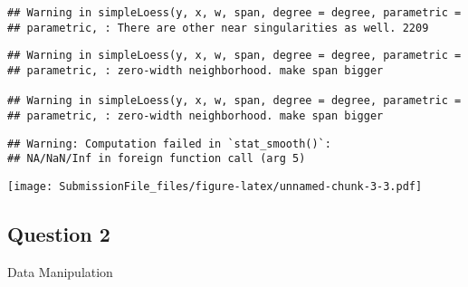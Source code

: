 \documentclass[]{article}
\newenvironment{Shaded}{\begin{snugshade}}{\end{snugshade}}
\newcommand{\DataTypeTok}[1]{\textcolor[rgb]{0.13,0.29,0.53}{#1}}
\newcommand{\KeywordTok}[1]{\textcolor[rgb]{0.13,0.29,0.53}{\textbf{#1}}}
\newcommand{\NormalTok}[1]{#1}
\newcommand{\OperatorTok}[1]{\textcolor[rgb]{0.81,0.36,0.00}{\textbf{#1}}}
\newcommand{\StringTok}[1]{\textcolor[rgb]{0.31,0.60,0.02}{#1}}
\begin{document}
\begin{verbatim}
## Warning in simpleLoess(y, x, w, span, degree = degree, parametric =
## parametric, : There are other near singularities as well. 2209
\end{verbatim}

\begin{verbatim}
## Warning in simpleLoess(y, x, w, span, degree = degree, parametric =
## parametric, : zero-width neighborhood. make span bigger

## Warning in simpleLoess(y, x, w, span, degree = degree, parametric =
## parametric, : zero-width neighborhood. make span bigger
\end{verbatim}

\begin{verbatim}
## Warning: Computation failed in `stat_smooth()`:
## NA/NaN/Inf in foreign function call (arg 5)
\end{verbatim}

\texttt{[image: SubmissionFile\_files/figure-latex/unnamed-chunk-3-3.pdf]}

\hypertarget{question-2}{%
\subsection{Question 2}\label{question-2}}

Data Manipulation

\begin{Shaded}
\end{Shaded}
\end{document}
